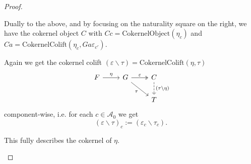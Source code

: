 \begin{proof}
\begin{enumerate}
\begin{subproof}
Dually to the above, and by focusing on the naturality square on the right, we have the cokernel object $C$ with
$Cc = \mathrm{CokernelObject}(\eta_{c})$ and $Ca = \mathrm{CokernelColift}(\eta_{c}, Ga\varepsilon_{c'})$.

Again we get the cokernel colift $(\varepsilon \backslash \tau) = \mathrm{CokernelColift}(\eta, \tau)$
\[
\begin{tikzcd}
F \arrow[r, "\eta"] & G \arrow[r, "\varepsilon", two heads] \arrow[rd, "\tau"'] & C \arrow[d, "(\tau\backslash\eta)", dashed]                                           \\
                    &                                                & T 
\end{tikzcd}
\]
component-wise, i.e. for each $c \in \mathcal{A}_{0}$ we get
\[
(\varepsilon \backslash \tau)_{c} := (\varepsilon_{c} \backslash \tau_{c}).
\]

This fully describes the cokernel of $\eta$.
\end{subproof}


\end{enumerate}
\end{proof}

